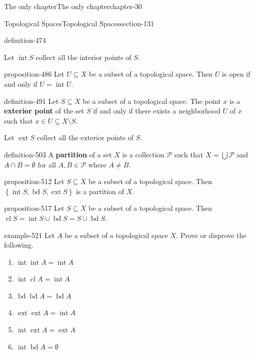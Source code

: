 \documentclass[oneside,10pt,]{book}
\newcommand{\terminology}[1]{\textbf{#1}}
\newcommand{\mc}{\mathcal}
\newcommand{\cl}{\operatorname{cl}}
\renewcommand{\int}{\operatorname{int}}
\newcommand{\ext}{\operatorname{ext}}
\newcommand{\bd}{\operatorname{bd}}
\newcommand{\setList}[1]{\left\{#1\right\}}
\begin{document}
\begin{chapterptx}{The only chapter}{}{The only chapter}{}{}{chapter-30}
\begin{sectionptx}{Topological Spaces}{}{Topological Spaces}{}{}{section-131}
\begin{definition}{}{definition-474}
\par
\hypertarget{p-483}{}%
Let \(\int S\) collect all the interior points of \(S\).%
\end{definition}
\begin{proposition}{}{}{proposition-486}%
\hypertarget{p-487}{}%
Let \(U\subseteq X\) be a subset of a topological space. Then \(U\) is open if and only if \(U=\int U\).%
\end{proposition}
\begin{definition}{}{definition-491}%
\hypertarget{p-492}{}%
Let \(S\subseteq X\) be a subset of a topological space. The point \(x\) is a \terminology{exterior point} of the set \(S\) if and only if there exists a neighborhood \(U\) of \(x\) such that \(x\in U\subseteq X\setminus S\).%
\par
\hypertarget{p-500}{}%
Let \(\ext S\) collect all the exterior points of \(S\).%
\end{definition}
\begin{definition}{}{definition-503}%
\hypertarget{p-504}{}%
A \terminology{partition} of a set \(X\) is a collection \(\mc P\) such that \(X=\bigcup\mc P\) and \(A\cap B=\emptyset\) for all \(A,B\in\mc P\) where \(A\not=B\).%
\end{definition}
\begin{proposition}{}{}{proposition-512}%
\hypertarget{p-513}{}%
Let \(S\subseteq X\) be a subset of a topological space. Then \(\setList{\int S,\bd S,\ext S}\) is a partition of \(X\).%
\end{proposition}
\begin{proposition}{}{}{proposition-517}%
\hypertarget{p-518}{}%
Let \(S\subseteq X\) be a subset of a topological space. Then \(\cl S=\int S\cup\bd S=S\cup\bd S\).%
\end{proposition}
\begin{example}{}{example-521}%
\hypertarget{p-522}{}%
Let \(A\) be a subset of a topological space \(X\). Prove or disprove the following.%
\leavevmode%
\begin{enumerate}
\item\hypertarget{li-526}{}\(\int\int A=\int A\)%
\item\hypertarget{li-528}{}\(\int\cl A=\int A\)%
\item\hypertarget{li-530}{}\(\bd\bd A=\bd A\)%
\item\hypertarget{li-532}{}\(\ext\ext A=\int A\)%
\item\hypertarget{li-534}{}\(\int\ext A=\ext A\)%
\item\hypertarget{li-536}{}\(\int\bd A=\emptyset\)%

\end{enumerate}
\end{example}
\end{sectionptx}
\end{chapterptx}
\end{document}
